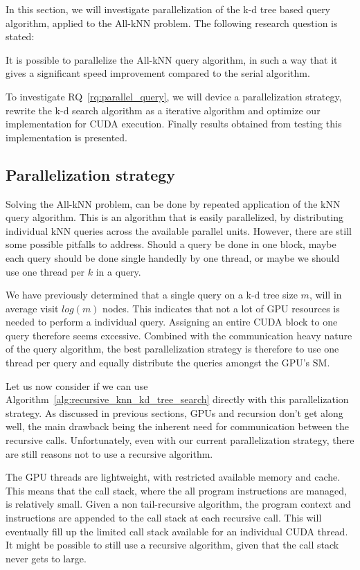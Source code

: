 In this section, we will investigate parallelization of the k-d tree based query algorithm, applied to the All-kNN problem. The following research question is stated:

\begin{myrq}
\label{rq:parallel_query}
    It is possible to parallelize the All-kNN query algorithm, in such a way that it gives a significant speed improvement compared to the serial algorithm.
\end{myrq}

To investigate RQ~\ref{rq:parallel_query}, we will device a parallelization strategy, rewrite the k-d search algorithm as a iterative algorithm and optimize our implementation for CUDA execution. Finally results obtained from testing this implementation is presented.

\subsection{Parallelization strategy} %
\label{sub:parallelization_strategy}

Solving the All-kNN problem, can be done by repeated application of the kNN query algorithm. This is an algorithm that is easily parallelized, by distributing individual kNN queries across the available parallel units. However, there are still some possible pitfalls to address. Should a query be done in one block, maybe each query should be done single handedly by one thread, or maybe we should use one thread per $k$ in a query.

We have previously determined that a single query on a k-d tree size $m$, will in average visit $log(m)$ nodes. This indicates that not a lot of GPU resources is needed to perform a individual query. Assigning an entire CUDA block to one query therefore seems excessive. Combined with the communication heavy nature of the query algorithm, the best parallelization strategy is therefore to use one thread per query and equally distribute the queries amongst the GPU's SM\@.

Let us now consider if we can use Algorithm~\ref{alg:recursive_knn_kd_tree_search} directly with this parallelization strategy. As discussed in previous sections, GPUs and recursion don't get along well, the main drawback being the inherent need for communication between the recursive calls. Unfortunately, even with our current parallelization strategy, there are still reasons not to use a recursive algorithm. 

The GPU threads are lightweight, with restricted available memory and cache. This means that the call stack, where the all program instructions are managed, is relatively small. Given a non tail-recursive algorithm, the program context and instructions are appended to the call stack at each recursive call. This will eventually fill up the limited call stack available for an individual CUDA thread. It might be possible to still use a recursive algorithm, given that the call stack never gets to large.

